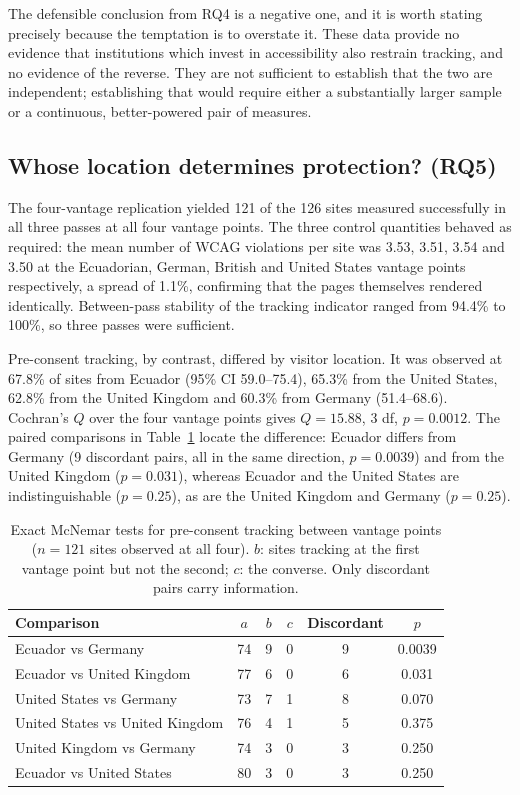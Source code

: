 \documentclass[pdflatex,sn-basic,Numbered]{sn-jnl}
\theoremstyle{thmstyleone}
\theoremstyle{thmstyletwo}
\theoremstyle{thmstylethree}
\begin{document}
The defensible conclusion from RQ4 is a negative one, and it is worth stating precisely because the temptation is to overstate it. These data provide no evidence that institutions which invest in accessibility also restrain tracking, and no evidence of the reverse. They are not sufficient to establish that the two are independent; establishing that would require either a substantially larger sample or a continuous, better-powered pair of measures.

\subsection{Whose location determines protection? (RQ5)}\label{sec:results-vantage}

The four-vantage replication yielded 121 of the 126 sites measured successfully in all three passes at all four vantage points. The three control quantities behaved as required: the mean number of WCAG violations per site was 3.53, 3.51, 3.54 and 3.50 at the Ecuadorian, German, British and United States vantage points respectively, a spread of 1.1\%, confirming that the pages themselves rendered identically. Between-pass stability of the tracking indicator ranged from 94.4\% to 100\%, so three passes were sufficient.

Pre-consent tracking, by contrast, differed by visitor location. It was observed at 67.8\% of sites from Ecuador (95\% CI 59.0--75.4), 65.3\% from the United States, 62.8\% from the United Kingdom and 60.3\% from Germany (51.4--68.6). Cochran's $Q$ over the four vantage points gives $Q=15.88$, 3 df, $p=0.0012$. The paired comparisons in Table~\ref{tab:vantage} locate the difference: Ecuador differs from Germany (9 discordant pairs, all in the same direction, $p=0.0039$) and from the United Kingdom ($p=0.031$), whereas Ecuador and the United States are indistinguishable ($p=0.25$), as are the United Kingdom and Germany ($p=0.25$).

\begin{table}[htbp]
	\centering
	\caption{Exact McNemar tests for pre-consent tracking between vantage points ($n=121$ sites observed at all four). $b$: sites tracking at the first vantage point but not the second; $c$: the converse. Only discordant pairs carry information.}\label{tab:vantage}
	\small
	\begin{tabular}{@{}lccccc@{}}
		\toprule
		\textbf{Comparison} & $a$ & $b$ & $c$ & \textbf{Discordant} & \textbf{$p$} \\
		\midrule
		Ecuador vs Germany & 74 & 9 & 0 & 9 & 0.0039 \\
		Ecuador vs United Kingdom & 77 & 6 & 0 & 6 & 0.031 \\
		United States vs Germany & 73 & 7 & 1 & 8 & 0.070 \\
		United States vs United Kingdom & 76 & 4 & 1 & 5 & 0.375 \\
		United Kingdom vs Germany & 74 & 3 & 0 & 3 & 0.250 \\
		Ecuador vs United States & 80 & 3 & 0 & 3 & 0.250 \\
		\bottomrule
	\end{tabular}
\end{table}
\end{document}
